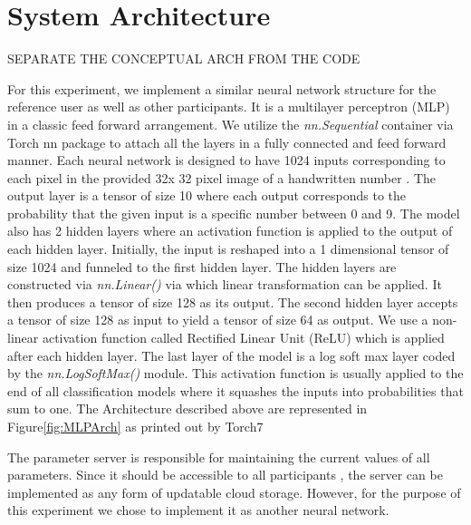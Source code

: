 \documentclass[conference]{IEEEtran}
\begin{document}

\section{System Architecture}

SEPARATE THE CONCEPTUAL ARCH FROM THE CODE

For this experiment, we implement a similar neural network structure for the reference user as well as other participants. It is a
multilayer perceptron (MLP) in a classic feed forward arrangement. We utilize the \textit{nn.Sequential} container via Torch nn package
to attach all the layers in a fully connected and feed forward manner. Each neural network is designed to have 1024 inputs
corresponding to each pixel in the provided 32x 32 pixel image of a handwritten number \cite{deng2012mnist}. The output layer is a
tensor of size 10 where each output corresponds to the probability that the given input is a specific number between 0 and 9. The model
also has 2 hidden layers where an activation function is applied to the output of each hidden layer.
Initially, the input is reshaped into a 1 dimensional tensor of size 1024 and funneled to the first hidden layer. The hidden layers are constructed via \textit{nn.Linear()} via which linear transformation can be applied. It then produces a tensor of size 128 as its output. The second hidden layer accepts a tensor of size 128 as input to yield a tensor of size 64 as output. We use a non-linear activation function called Rectified Linear Unit (ReLU) which is applied after each hidden layer. The last layer of the model is a log soft max layer coded by the \textit{nn.LogSoftMax()} module.  This activation function is usually applied to the end of all classification models where it squashes the inputs into probabilities that sum to one.
The Architecture described above are represented in Figure\ref{fig:MLPArch} as printed out by Torch7
   
The parameter server is responsible for maintaining the current values of all parameters. Since it should be accessible to all
participants , the server can be implemented as any form of updatable cloud storage. However, for the purpose of this experiment we
chose to implement it as another neural network. 
\end{document}

